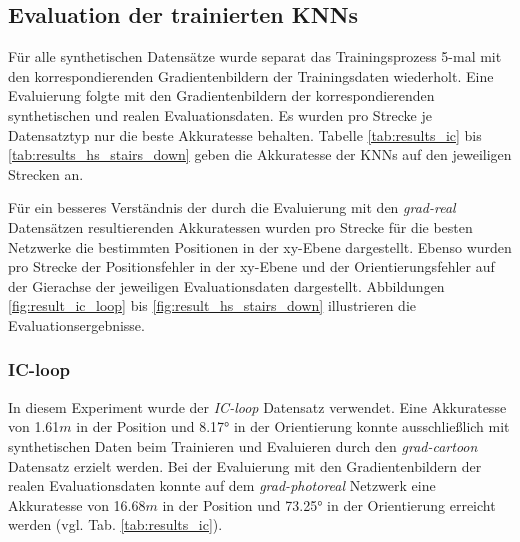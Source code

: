 \subsection{Evaluation der trainierten KNNs}
Für alle synthetischen Datensätze wurde separat das Trainingsprozess 5-mal mit den korrespondierenden Gradientenbildern der Trainingsdaten wiederholt. Eine Evaluierung folgte mit den Gradientenbildern der korrespondierenden synthetischen und realen Evaluationsdaten. Es wurden pro Strecke je Datensatztyp nur die beste Akkuratesse behalten. Tabelle \ref{tab:results_ic} bis \ref{tab:results_hs_stairs_down} geben die Akkuratesse der KNNs auf den jeweiligen Strecken an. 

Für ein besseres Verständnis der durch die Evaluierung mit den \textit{grad-real} Datensätzen resultierenden Akkuratessen wurden pro Strecke für die besten Netzwerke die bestimmten Positionen in der xy-Ebene dargestellt. Ebenso wurden pro Strecke der Positionsfehler in der xy-Ebene und der Orientierungsfehler auf der Gierachse der jeweiligen Evaluationsdaten dargestellt. Abbildungen \ref{fig:result_ic_loop} bis \ref{fig:result_hs_stairs_down} illustrieren die Evaluationsergebnisse.


\subsubsection{IC-loop}

In diesem Experiment wurde der \textit{IC-loop} Datensatz verwendet. 
Eine Akkuratesse von 1.61$m$ in der Position und 8.17° in der Orientierung konnte ausschließlich mit synthetischen Daten beim Trainieren und Evaluieren durch den \textit{grad-cartoon} Datensatz erzielt werden. Bei der Evaluierung mit den Gradientenbildern der realen Evaluationsdaten konnte auf dem \textit{grad-photoreal} Netzwerk eine Akkuratesse von 16.68$m$ in der Position und 73.25° in der Orientierung erreicht werden (vgl. Tab. \ref{tab:results_ic}). 


